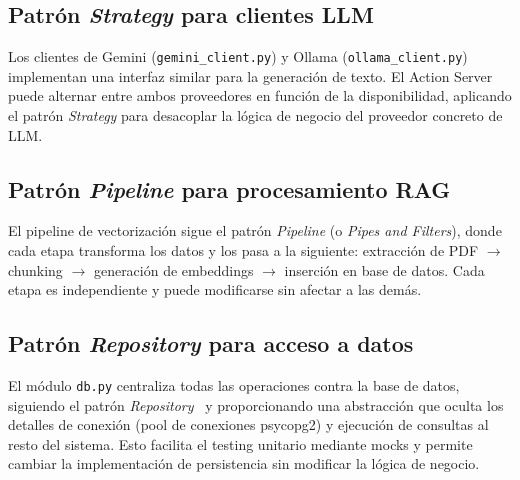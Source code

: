\subsection{Patrón \textit{Strategy} para clientes LLM}

Los clientes de Gemini (\texttt{gemini\_client.py}) y Ollama (\texttt{ollama\_client.py}) implementan una interfaz similar para la generación de texto. El Action Server puede alternar entre ambos proveedores en función de la disponibilidad, aplicando el patrón \textit{Strategy} para desacoplar la lógica de negocio del proveedor concreto de LLM.

\subsection{Patrón \textit{Pipeline} para procesamiento RAG}

El pipeline de vectorización sigue el patrón \textit{Pipeline} (o \textit{Pipes and Filters}), donde cada etapa transforma los datos y los pasa a la siguiente: extracción de PDF $\rightarrow$ chunking $\rightarrow$ generación de embeddings $\rightarrow$ inserción en base de datos. Cada etapa es independiente y puede modificarse sin afectar a las demás.

\subsection{Patrón \textit{Repository} para acceso a datos}

El módulo \texttt{db.py} centraliza todas las operaciones contra la base de datos, siguiendo el patrón \textit{Repository}~\cite{fowler2002patterns} y proporcionando una abstracción que oculta los detalles de conexión (pool de conexiones psycopg2) y ejecución de consultas al resto del sistema. Esto facilita el testing unitario mediante mocks y permite cambiar la implementación de persistencia sin modificar la lógica de negocio.
